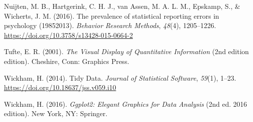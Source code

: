 \documentclass[]{article}
\begin{document}
\leavevmode\hypertarget{ref-nuijtenPrevalenceStatisticalReporting2016}{}%
Nuijten, M. B., Hartgerink, C. H. J., van Assen, M. A. L. M., Epskamp, S., \& Wicherts, J. M. (2016). The prevalence of statistical reporting errors in psychology (19852013). \emph{Behavior Research Methods}, \emph{48}(4), 1205--1226. \url{https://doi.org/10.3758/s13428-015-0664-2}

\leavevmode\hypertarget{ref-tufteVisualDisplayQuantitative2001}{}%
Tufte, E. R. (2001). \emph{The Visual Display of Quantitative Information} (2nd edition edition). Cheshire, Conn: Graphics Press.

\leavevmode\hypertarget{ref-wickhamTidyData2014}{}%
Wickham, H. (2014). Tidy Data. \emph{Journal of Statistical Software}, \emph{59}(1), 1--23. \url{https://doi.org/10.18637/jss.v059.i10}

\leavevmode\hypertarget{ref-wickhamGgplot2ElegantGraphics2016}{}%
Wickham, H. (2016). \emph{Ggplot2: Elegant Graphics for Data Analysis} (2nd ed. 2016 edition). New York, NY: Springer.
\end{document}
